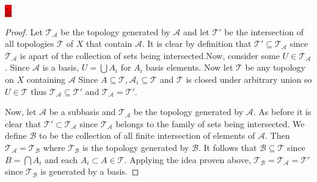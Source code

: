 \documentclass{exam}
\begin{document}
\colorbox{red}{\underline{5:}}
\begin{solution}
    \begin{proof}
        Let $\mathcal{T}_{\mathcal{A}}$ be the topology generated by $\mathcal{A}$ and let $\mathcal{T}'$ be the intersection of all topologies $\mathcal{T}$ of $X$ that contain $\mathcal{A}$. It is clear by definition that $\mathcal{T}' \subseteq \mathcal{T}_{\mathcal{A}}$ since $\mathcal{T}_\mathcal{A}$ is apart of the collection of sets being intersected.Now, consider some $U \in \mathcal{T}_{\mathcal{A}}$. Since $\mathcal{A}$ is a basis, $U = \bigcup A_i$ for $A_i$ basis elements. Now let $\mathcal{T}$ be any topology on $X$ containing $\mathcal{A}$ Since $A \subseteq \mathcal{T}, \mathcal{A}_i \subseteq \mathcal{T}$ and $\mathcal{T}$ is closed under arbitrary union so $U \in \mathcal{T}$ thus $\mathcal{T}_{\mathcal{A}} \subseteq \mathcal{T}'$ and $\mathcal{T}_{\mathcal{A}} = \mathcal{T}'$. 

        Now, let $\mathcal{A}$ be a subbasis and $\mathcal{T}_\mathcal{A}$ be the topology generated by $\mathcal{A}$. As before it is clear that $\mathcal{T}' \subset \mathcal{T}_\mathcal{A}$ since $\mathcal{T}_\mathcal{A}$ belongs to the family of sets being intersected. We define $\mathcal{B}$ to be the collection of all finite intersection of elements of $\mathcal{A}$. Then $\mathcal{T}_\mathcal{A} = \mathcal{T}_\mathcal{B}$ where $\mathcal{T}_\mathcal{B}$ is the topology generated by $\mathcal{B}$. It follows that $\mathcal{B} \subseteq \mathcal{T}$ since $B = \bigcap A_i$ and each $A_i \subset A \in \mathcal{T}$. Applying the idea proven above, $\mathcal{T}_\mathcal{B} = \mathcal{T}_\mathcal{A} = \mathcal{T}'$ since $\mathcal{T}_\mathcal{B}$ is generated by a basis.
    \end{proof}
\end{solution}
\end{document}
